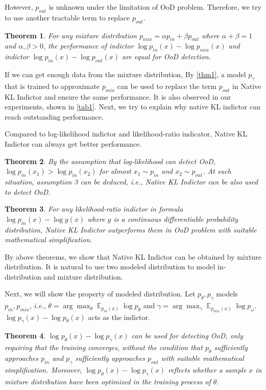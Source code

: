 \documentclass[letterpaper]{article} %
\newtheorem{theorem}{Theorem}
\newcommand{\IE}{\textit{i.e.}, }
\newcommand{\E}{\operatorname{\mathbb{E}}}
\newcommand{\pin}{p_{in}}
\newcommand{\pout}{p_{out}}
\newcommand{\pmix}{p_{mix}}
\begin{document}
However, $\pout$ is unknown under the limitation of OoD problem. Therefore, we try to use another tractable term to replace $\pout$. 

\begin{theorem}\label{thm2}
	For any mixture distribution $\pmix = \alpha \pin + \beta \pout$ where $\alpha + \beta = 1$ and $\alpha, \beta > 0$, the performance of indictor $\log \pin(x) - \log \pmix(x)$ and indictor $\log \pin(x) - \log \pout(x)$ are equal for OoD detection. 
\end{theorem}

If we can get enough data from the mixture distribution, By \cref{thm1}, a model $p_\gamma$ that is trained to approximate $\pmix$ can be used to replace the term $\pout$ in Native KL Indictor and ensure the same performance. It is also observed in our experiments, shown in \cref{tab1}. Next, we try to explain why native KL indictor can reach outstanding performance.

Compared to log-likelihood indictor and likelihood-ratio indicator, Native KL Indictor can always get better performance. 
\begin{theorem}\label{thm3}
By the assumption that log-likelihood can detect OoD, $\log \pin(x_1) > \log \pin(x_2)$ for almost $x_1 \sim \pin$ and $x_2 \sim \pout$. At such situation, assumption 3 can be deduced, \IE Native KL Indictor can be also used to detect OoD. 
\end{theorem}

\begin{theorem}\label{thm4}
For any likelihood-ratio indictor in formula $\log \pin(x) - \log g(x)$ where $g$ is a continuous differentiable probability distribution, Native KL Indictor outperforms them in OoD problem with suitable mathematical simplification. 
\end{theorem}

By above theorems, we show that Native KL Indictor can be obtained by mixture distribution. It is natural to use two modeled distribution to model in-distribution and mixture distribution. 

Next, we will show the property of modeled distribution. Let $p_\theta, p_\gamma$ models $\pin, \pmix$, \IE $\theta = \arg \max_\theta \E_{\pin(x)} \log p_\theta$ and $\gamma = \arg \max_\gamma \E_{\pmix(x)} \log p_\omega$. $\log p_\gamma(x) - \log p_\theta(x)$ acts as the indictor. 

\begin{theorem}\label{thm5}
	$\log p_\theta(x) - \log p_\gamma(x)$ can be used for detecting OoD, only requiring that the training converges, without the condition that $p_\theta$ sufficiently approaches $\pin$ and $p_\gamma$ sufficiently approaches $\pout$ with suitable mathematical simplification. Moreover, $\log p_\theta(x) - \log p_\gamma(x)$ reflects whether a sample $x$ in mixture distribution have been optimized in the training process of $\theta$. 
\end{theorem}
\end{document}
